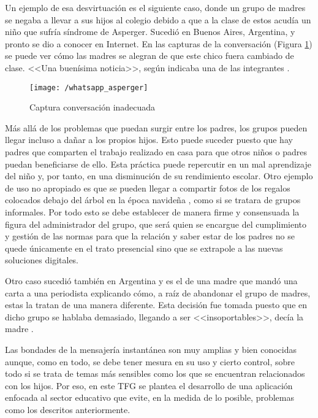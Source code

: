 \newpage

Un ejemplo de esa desvirtuación es el siguiente caso, donde un grupo de madres se negaba a llevar a sus hijos al colegio debido a que a la clase de estos acudía un niño que sufría síndrome de Asperger. Sucedió en Buenos Aires, Argentina, y pronto se dio a conocer en Internet.
En las capturas de la conversación (Figura \ref{fig:whatasper}) se puede ver cómo las madres se alegran de que este chico fuera cambiado de clase. <<Una buenísima noticia>>, según indicaba una de las integrantes \cite{Vanguardia2017}.

\begin{figure}[!h]
	\begin{center}
		\texttt{[image: /whatsapp\_asperger]}
		\caption{Captura conversación inadecuada}
		\label{fig:whatasper}
	\end{center}
\end{figure}

Más allá de los problemas que puedan surgir entre los padres, los grupos pueden llegar incluso a dañar a los propios hijos. Esto puede suceder puesto que hay padres que comparten el trabajo realizado en casa para que otros niños o padres puedan beneficiarse de ello. Esta práctica puede repercutir en un mal aprendizaje del niño y, por tanto, en una disminución de su rendimiento escolar. Otro ejemplo de uso no apropiado es que se pueden llegar a compartir fotos de los regalos colocados debajo del árbol en la época navideña \cite{Alias2017}, como si se tratara de grupos informales. Por todo esto se debe establecer de manera firme y consensuada la figura del administrador del grupo, que será quien se encargue del cumplimiento y gestión de las normas para que la relación y saber estar de los padres no se quede únicamente en el trato presencial sino que se extrapole a las nuevas soluciones digitales.

Otro caso sucedió también en Argentina y es el de una madre que mandó una carta a una periodista explicando cómo, a raíz de abandonar el grupo de madres, estas la tratan de una manera diferente. Esta decisión fue tomada puesto que en dicho grupo se hablaba demasiado, llegando a ser <<insoportables>>, decía la madre \cite{Consuelo2017}.

\newpage

Las bondades de la mensajería instantánea son muy amplias y bien conocidas aunque, como en todo, se debe tener mesura en su uso y cierto control, sobre todo si se trata de temas más sensibles como los que se encuentran relacionados con los hijos. Por eso, en este \acs{TFG} se plantea el desarrollo de una aplicación enfocada al sector educativo que evite, en la medida de lo posible, problemas como los descritos anteriormente.

